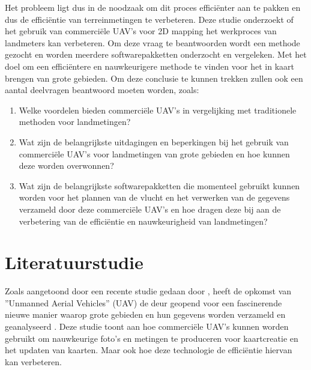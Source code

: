 \documentclass{hogent-article}
\begin{document}
Het probleem ligt dus in de noodzaak om dit proces efficiënter aan te pakken en dus de efficiëntie van terreinmetingen te verbeteren.
Deze studie onderzoekt of het gebruik van commerciële UAV's voor 2D mapping het werkproces van landmeters kan verbeteren.
Om deze vraag te beantwoorden wordt een methode gezocht en worden meerdere softwarepakketten onderzocht en vergeleken.
Met het doel om een efficiëntere en nauwkeurigere methode te vinden voor het in kaart brengen van grote gebieden.
Om deze conclusie te kunnen trekken zullen ook een aantal deelvragen beantwoord moeten worden, zoals:
\begin{enumerate}
\item Welke voordelen bieden commerciële UAV's in vergelijking met traditionele methoden voor landmetingen?
\item Wat zijn de belangrijkste uitdagingen en beperkingen bij het gebruik van commerciële UAV's voor landmetingen van grote gebieden en hoe kunnen deze worden overwonnen?
\item Wat zijn de belangrijkste softwarepakketten die momenteel gebruikt kunnen worden voor het plannen van de vlucht en het verwerken van de gegevens verzameld door deze commerciële UAV's en hoe dragen deze bij aan de verbetering van de efficiëntie en nauwkeurigheid van landmetingen?
\end{enumerate}

\section{Literatuurstudie}%
\label{sec:literatuurstudie}


Zoals aangetoond door een recente studie gedaan door \textcite{Koeva2016}, heeft de opkomst van ''Unmanned Aerial Vehicles'' (UAV) de deur geopend voor een fascinerende nieuwe manier waarop grote gebieden en hun gegevens worden verzameld en geanalyseerd \autocite{UAVDefinitie}.
Deze studie toont aan hoe commerciële UAV's kunnen worden gebruikt om nauwkeurige foto's en metingen te produceren voor kaartcreatie en het updaten van kaarten.
Maar ook hoe deze technologie de efficiëntie hiervan kan verbeteren.
\end{document}
